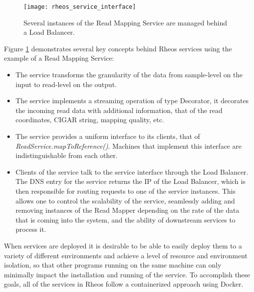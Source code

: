 \begin{figure}[H]
    \texttt{[image: rheos\_service\_interface]}
    \centering
    \caption {Several instances of the Read Mapping Service are managed behind a Load Balancer.}
    \label{fig:rheos_service_interface}
\end{figure}
\newpage
Figure \ref{fig:rheos_service_interface} demonstrates several key concepts behind Rheos services using the example of a Read Mapping Service:

\begin{itemize}
    \item The service transforms the granularity of the data from sample-level on the input to read-level on the output. 
    \item The service implements a streaming operation of type Decorator, it decorates the incoming read data with additional information, that of the read coordinates, CIGAR string, mapping quality, etc. 
    \item The service provides a uniform interface to its clients, that of \emph{ReadService.mapToReference()}. Machines that implement this interface are indistinguishable from each other. 
    \item Clients of the service talk to the service interface through the Load Balancer. The DNS entry for the service returns the IP of the Load Balancer, which is then responsible for routing requests to one of the service instances. This allows one to control the scalability of the service, seamlessly adding and removing instances of the Read Mapper depending on the rate of the data that is coming into the system, and the ability of downstream services to process it.  
\end{itemize}

When services are deployed it is desirable to be able to easily deploy them to a variety of different environments and achieve a level of resource and environment isolation, so that other programs running on the same machine can only minimally impact the installation and running of the service. To accomplish these goals, all of the services in Rheos follow a containerized approach using Docker\autocite{merkel2014docker}.

